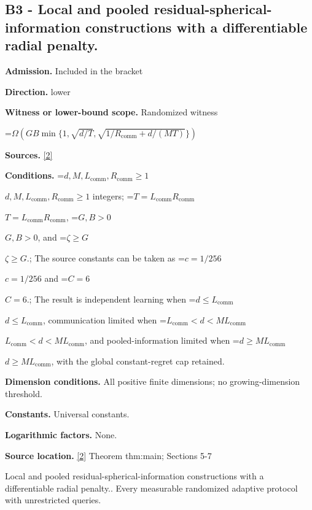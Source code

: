 \documentclass[10pt,a4paper]{article}
\newcommand{\AtlasMath}[1]{\par\begingroup\centering\setbox0=\hbox{$\displaystyle #1$}\ifdim\wd0>1.4\linewidth\typeout{ATLAS WIDE FORMULA: \the\wd0}\fi\ifdim\wd0>\linewidth\resizebox{\linewidth}{!}{\box0}\else\box0\fi\par\endgroup}
\newcommand{\AtlasInlineMath}[1]{\begingroup\setbox0=\hbox{$#1$}\ifdim\wd0>.4\linewidth\endgroup\AtlasMath{#1}\else\endgroup$#1$\fi}
\begin{document}
\subsection{B3 - Local and pooled residual-spherical-information constructions with a differentiable radial penalty.}


\textbf{Admission.} Included in the bracket



\textbf{Direction.} lower



\textbf{Witness or lower-bound scope.} Randomized witness



\AtlasMath{\Omega\!\left(GB\min\{1,\sqrt{d/T},\sqrt{1/R_{\mathrm{comm}}+d/(MT)}\}\right)}


\textbf{Sources.} \href{https://github.com/WU-Wendao/Colombo/blob/main/colombo_sensorium/Complexity_altas/data/sources/colombo/A7/manuscript.pdf}{[2]}



\textbf{Conditions.} \AtlasInlineMath{d,M,L_{\mathrm{comm}},R_{\mathrm{comm}}\ge1} integers; \AtlasInlineMath{T=L_{\mathrm{comm}}R_{\mathrm{comm}}}, \AtlasInlineMath{G,B>0}, and \AtlasInlineMath{\zeta\ge G}.; The source constants can be taken as \AtlasInlineMath{c=1/256} and \AtlasInlineMath{C=6}.; The result is independent learning when \AtlasInlineMath{d\le L_{\mathrm{comm}}}, communication limited when \AtlasInlineMath{L_{\mathrm{comm}}<d<ML_{\mathrm{comm}}}, and pooled-information limited when \AtlasInlineMath{d\ge ML_{\mathrm{comm}}}, with the global constant-regret cap retained.



\textbf{Dimension conditions.} All positive finite dimensions; no growing-dimension threshold.



\textbf{Constants.} Universal constants.



\textbf{Logarithmic factors.} None.



\textbf{Source location.} \href{https://github.com/WU-Wendao/Colombo/blob/main/colombo_sensorium/Complexity_altas/data/sources/colombo/A7/manuscript.pdf}{[2]} Theorem thm:main; Sections 5-7



Local and pooled residual-spherical-information constructions with a differentiable radial penalty.. Every measurable randomized adaptive protocol with unrestricted queries.
\end{document}
